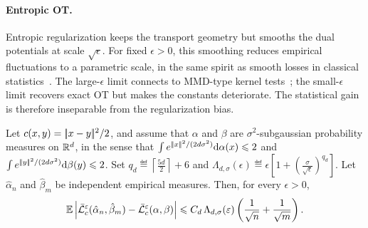 \paragraph{Entropic OT.}
Entropic regularization keeps the transport geometry but smooths the dual potentials at scale \(\sqrt\epsilon\). For fixed \(\epsilon>0\), this smoothing reduces empirical fluctuations to a parametric scale, in the same spirit as smooth losses in classical statistics~\cite{genevay2018sample,bigot2017central,mena2019statistical}. The large-\(\epsilon\) limit connects to MMD-type kernel tests~\cite{feydy2018interpolating,gretton2012kernel}; the small-\(\epsilon\) limit recovers exact OT but makes the constants deteriorate. The statistical gain is therefore inseparable from the regularization bias.

\begin{prop}\label{prop-sinkhorn-sample-rate}
	Let \(c(x,y)=|\!| x-y |\!|^2/2\), and assume that \(\alpha\) and \(\beta\) are \(\sigma^2\)-subgaussian probability measures on \(\mathbb{R}^d\), in the sense that
	$\int e^{|\!| x |\!|^2/(2d\sigma^2)}\mathrm{d}\alpha(x)\leqslant2$ and $\int e^{|\!| y |\!|^2/(2d\sigma^2)}\mathrm{d}\beta(y)\leqslant2$.
	Set
	$q_d\eqdef\left\lceil\frac{5d}{2}\right\rceil+6$ and $\Lambda_{d,\sigma}(\epsilon) \eqdef \epsilon\left[1+\left(\frac{\sigma}{\sqrt\epsilon}\right)^{q_d}\right]$.
	Let \(\hat\alpha_n\) and \(\hat\beta_m\) be independent empirical measures. Then, for every \(\epsilon>0\),
	\[
		\mathbb{E}\left\lvert\bar{\mathcal{L}}_c^\varepsilon(\hat\alpha_n,\hat\beta_m)-\bar{\mathcal{L}}_c^\varepsilon(\alpha,\beta)\right\rvert
		\leqslant
		C_d\,\Lambda_{d,\sigma}(\varepsilon)
		\left(\frac1{\sqrt n}+\frac1{\sqrt m}\right).
	\]
\end{prop}

